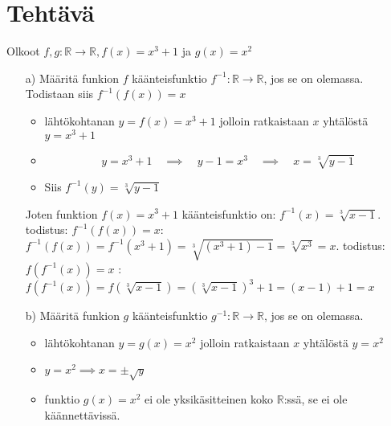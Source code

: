 \documentclass{article}
\newcounter{tehtava}
\begin{document}
    \newpage
    \section*{Tehtävä \thetehtava}
    Olkoot $f, g: \mathbb{R} \rightarrow \mathbb{R}, f(x) = x^3 + 1$ ja $g(x) = x^2$
    \begin{itemize}
        \item[a)] Määritä funkion $f$ käänteisfunktio $f^{-1}:\mathbb{R} \rightarrow \mathbb{R}$, jos se on olemassa.\newline
        Todistaan siis $f^{-1} (f(x)) = x$
        \begin{itemize}
            \item lähtökohtanan $y = f(x) = x^3 + 1$ jolloin ratkaistaan $x$ yhtälöstä $y = x^3 + 1$
            \item \[y = x^3 + 1 \quad \implies \quad y - 1 = x^3 \quad \implies \quad x = \sqrt[3]{y - 1} \]
            \item Siis $f^{-1}(y) = \sqrt[3]{y - 1}$
        \end{itemize}
        Joten funktion $f(x) = x^3 + 1$ käänteisfunktio on: $f^{-1}(x) = \sqrt[3]{x - 1}$. todistus: $f^{-1}(f(x)) = x$: \newline
        $f^{-1}(f(x)) = f^{-1}(x^3 + 1) = \sqrt[3]{(x^3 + 1) - 1} = \sqrt[3]{x^3} = x$. todistus: $f(f^{-1}(x)) = x$ :\newline
        $f(f^{-1}(x)) = f\left(\sqrt[3]{x - 1}\right) = \left(\sqrt[3]{x - 1}\right)^3 + 1 = (x - 1) + 1 = x$
        \item[b)] Määritä funkion $g$ käänteisfunktio $g^{-1}:\mathbb{R} \rightarrow \mathbb{R}$, jos se on olemassa.
        \begin{itemize}
            \item lähtökohtanan $y = g(x) = x^2$ jolloin ratkaistaan $x$ yhtälöstä $y = x^2$
            \item $y = x^2 \implies x = \pm \sqrt{y}$
            \item funktio $g(x) = x^2$ ei ole yksikäsitteinen koko $\mathbb{R}$:ssä, se ei ole käännettävissä.
        \end{itemize}
    \end{itemize}

    \newpage
\end{document}
